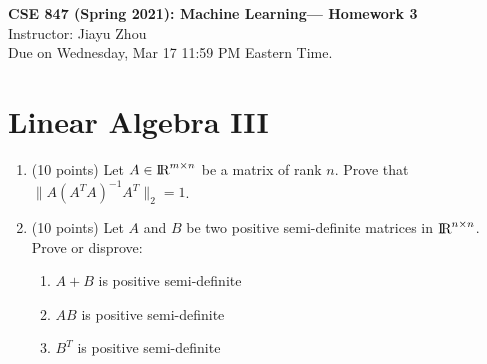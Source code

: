 \documentclass[11pt]{article}
\begin{document}
\thispagestyle {empty}


\newcommand{\lsp}[1]{\large\renewcommand{\baselinestretch}{#1}\normalsize}
\newcommand{\hsp}{\hspace{.2in}}
\newcommand{\comment}[1]{}
\newtheorem{thm}{Theorem}[section]
\newtheorem{lem}{Lemma}[section]
\newtheorem{cor}{Corollary}[section]
\newtheorem{prop}{Proposition}[section]
\newtheorem{problem}{Problem}[section]

\newcommand{\R}{{\rm\hbox{I\kern-.15em R}}}
\newcommand{\IR}{{\rm\hbox{I\kern-.15em R}}}
\newcommand{\II}{{\rm\hbox{I\kern-.15em I}}}
\newcommand{\IN}{{\rm\hbox{I\kern-.15em N}}}
\newcommand{\IZ}{{\sf\hbox{Z\kern-.40em Z}}}
\newcommand{\IS}{{\rm\hbox{S\kern-.45em S}}}
\newcommand{\Real}{I\!\!R}


\newcommand{\linesep}{\vspace{.2cm}\hrule\vspace{0.2cm}}
\newcommand{\categorysep}{\vspace{0.5cm}}
\newcommand{\entrysep}{\vspace{0cm}}

\newcommand{\category}[1]{\categorysep
                  \noindent {\bf \large #1}
              \linesep}

\pagestyle{empty}

\begin{center}
{\large \textbf{CSE 847 (Spring 2021): Machine Learning--- Homework 3}} \\
 Instructor: Jiayu Zhou \\
 Due on Wednesday, Mar 17 11:59 PM Eastern Time. 
\end{center}

\section{Linear Algebra III}

\begin{enumerate}

\item (10 points) Let $A \in \IR^{m \times n}$ be a matrix of rank $n$. Prove that $\| A(A^T A)^{-1} A^T \|_2 = 1$. 

\item (10 points) Let $A$ and $B$ be two positive semi-definite matrices in $\IR^{n \times n}$. Prove or disprove: 
\begin{enumerate}
\item $A+ B$ is positive semi-definite
\item $AB$ is positive semi-definite 
\item $B^T$ is positive semi-definite
\end{enumerate} 

\end{enumerate}
\end{document}
